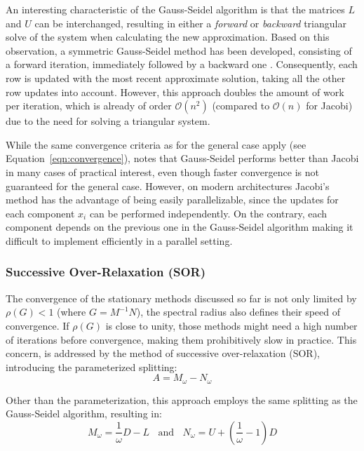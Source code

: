 \noindent An interesting characteristic of the Gauss-Seidel algorithm is that the matrices $L$ and $U$ can be interchanged, resulting in either a \textit{forward} or \textit{backward} triangular solve of the system when calculating the new approximation. Based on this observation, a symmetric Gauss-Seidel method has been developed, consisting of a forward iteration, immediately followed by a backward one \cite{saad_iterative_2003}. Consequently, each row is updated with the most recent approximate solution, taking all the other row updates into account. However, this approach doubles the amount of work per iteration, which is already of order $\mathcal{O}(n^2)$ (compared to $\mathcal{O}(n)$ for Jacobi) due to the need for solving a triangular system. 

While the same convergence criteria as for the general case apply (see Equation~\hyperref[eqn:convergence]{\ref{eqn:convergence}}), \cite{venit_convergence_1975} notes that Gauss-Seidel performs better than Jacobi in many cases of practical interest, even though faster convergence is not guaranteed for the general case. However, on modern architectures Jacobi's method has the advantage of being easily parallelizable, since the updates for each component $x_i$ can be performed independently. On the contrary, each component depends on the previous one in the Gauss-Seidel algorithm making it difficult to implement efficiently in a parallel setting.

\subsubsection{Successive Over-Relaxation (SOR)}
The convergence of the stationary methods discussed so far is not only limited by $\rho(G)<1$ (where $G=M^{-1}N$), the spectral radius also defines their speed of convergence. If $\rho(G)$ is close to unity, those methods might need a high number of iterations before convergence, making them prohibitively slow in practice. This concern, is addressed by the method of successive over-relaxation (SOR), introducing the parameterized splitting:
\begin{equation}
    A=M_\omega - N_\omega
\end{equation}

\noindent Other than the parameterization, this approach employs the same splitting as the Gauss-Seidel algorithm, resulting in:
\begin{equation}
    M_\omega=\frac{1}\omega{}D-L \;\;\text{ and } \;\; N_\omega=U+\left(\frac{1}{\omega}-1\right)D
\end{equation}

